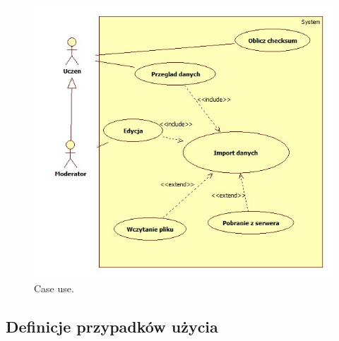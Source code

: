 \label{sec:diagramcaseuse}
\begin{figure}[H]
  \centering
    \includegraphics[width=\textwidth]{ge/caseuse.jpg}
  \caption{Case use.}
  \label{fig:caseuse}
\end{figure}

\subsection{Definicje przypadków użycia}
\label{sec:defCaseuse}

